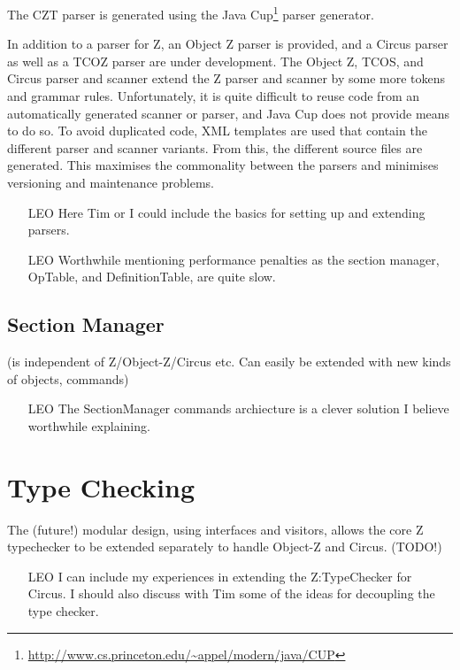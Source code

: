 \documentclass{llncs}
\begin{document}
  The CZT parser is generated using the Java
  Cup\footnote{\url{http://www.cs.princeton.edu/~appel/modern/java/CUP}}
  parser generator.

  In addition to a parser for Z, an Object Z parser is provided, and a
  Circus parser as well as a TCOZ parser are under development.  The
  Object Z, TCOS, and Circus parser and scanner extend the Z parser
  and scanner by some more tokens and grammar rules.  Unfortunately,
  it is quite difficult to reuse code from an automatically generated
  scanner or parser, and Java Cup does not provide means to do so.  To
  avoid duplicated code, XML templates are used that contain the
  different parser and scanner variants.  From this, the different
  source files are generated.  This maximises the commonality between
  the parsers and minimises versioning and maintenance problems.

  \begin{itemize}
    \item[LEO] Here Tim or I could include the basics for setting up
               and extending parsers.
    \item[LEO] Worthwhile mentioning performance penalties as the
               section manager, OpTable, and DefinitionTable, are
               quite slow.
  \end{itemize}

\subsection{Section Manager}

  (is independent of Z/Object-Z/Circus etc.
  Can easily be extended with new kinds of objects, commands)

    \begin{itemize}
        \item[LEO] The SectionManager commands archiecture is a clever solution I believe worthwhile explaining.
    \end{itemize}

\section{Type Checking}

      The (future!) modular design, using interfaces and visitors,
      allows the core Z typechecker to be extended separately
      to handle Object-Z and Circus.  (TODO!)

    \begin{itemize}
        \item[LEO] I can include my experiences in extending the Z:TypeChecker for Circus.
                    I should also discuss with Tim some of the ideas for decoupling the type checker.
    \end{itemize}
\end{document}
